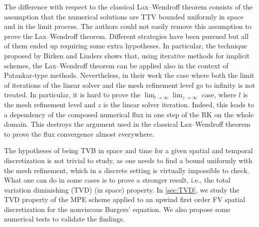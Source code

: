 \documentclass[final,11pt, times, linenumber, nopreprintline]{elsarticle}
\newcommand{\PO}[1]{{\color{blue}#1}}
\begin{document}
\begin{rmk}
    The difference with respect to the classical Lax--Wendroff theorem consists of the assumption that the numerical solutions are TTV bounded uniformly in space and in the limit process. The authors could not easily remove this assumption to prove the Lax--Wendroff theorem.
    Different strategies have been pursued but all of them ended up requiring some extra hypotheses.
    In particular, the technique proposed by Birken and Linders \cite{birken_conservation_2022} shows that, using iterative methods for implicit schemes, the Lax--Wendroff theorem can be applied also in the context of Patankar-type methods. Nevertheless, in their work the case where both the limit of iterations of the linear solver and the mesh refinement level go to infinity is not treated. In particular, it is hard to prove the $\lim_{l \to \infty} \lim_{z \to \infty}$  case, where $l$ is the mesh refinement level and $z$ is the linear solver iteration. Indeed, this leads to a dependency of the composed numerical flux in one step of the RK on the whole domain. This destroys the argument used in the classical Lax--Wendroff theorem to prove the flux convergence almost everywhere.
\end{rmk}


The hypotheses of being TVB in space and time for a given spatial and temporal discretization is not trivial to study, as one needs to find a bound uniformly with the mesh refinement, which in a discrete setting is virtually impossible to check.
What one can do in some cases is to prove a stronger result, i.e., the total variation diminishing (TVD) (in space) property.
In \ref{sec:TVD}, we study the TVD property of the MPE scheme applied to an upwind first order FV spatial discretization for the nonviscous Burgers' equation. We also propose some numerical tests to validate the findings.
\end{document}

